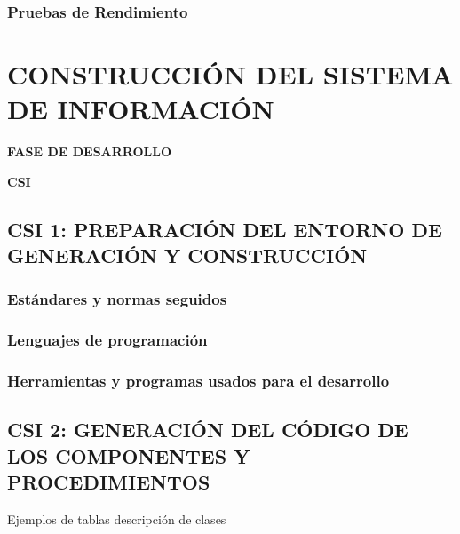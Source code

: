 \documentclass[11pt]{report}
\begin{document}
\subsection{Pruebas de Rendimiento} 


\newpage
\chapter{CONSTRUCCIÓN DEL SISTEMA DE INFORMACIÓN}
	\vspace{2cm}	
	\begin{center}
	{\Large \textbf{FASE DE DESARROLLO} \par}
	\end{center}
	\vspace{5cm}
	
	\begin{center}
	\Huge \textbf{CSI}\par
	\end{center}

\newpage


\section{CSI 1: PREPARACIÓN DEL ENTORNO DE GENERACIÓN Y CONSTRUCCIÓN}

\subsection{Estándares y normas seguidos}


\subsection{Lenguajes de programación}


\subsection{Herramientas y programas usados para el desarrollo}


\newpage
\section{CSI 2: GENERACIÓN DEL CÓDIGO DE LOS COMPONENTES Y PROCEDIMIENTOS}

\textcolor[rgb]{0.65,0.16,0}{Ejemplos de tablas descripción de clases}
\end{document}

